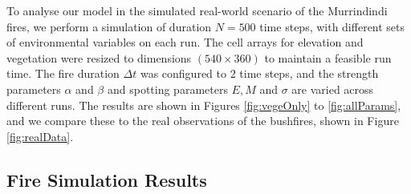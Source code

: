 \noindent To analyse our model in the simulated real-world scenario of the Murrindindi fires, we perform a simulation of duration $N=500$ time steps, with different sets of environmental variables on each run. The cell arrays for elevation and vegetation were resized to dimensions $(540 \times 360)$ to maintain a feasible run time. The fire duration $\Delta t$ was configured to $2$ time steps, and the strength parameters $\alpha$ and $\beta$ and spotting parameters $E,M$ and $\sigma$ are varied across different runs. The results are shown in Figures \ref{fig:vegeOnly} to \ref{fig:allParams}, and we compare these to the real observations of the bushfires, shown in Figure \ref{fig:realData}.

\subsection{Fire Simulation Results}
